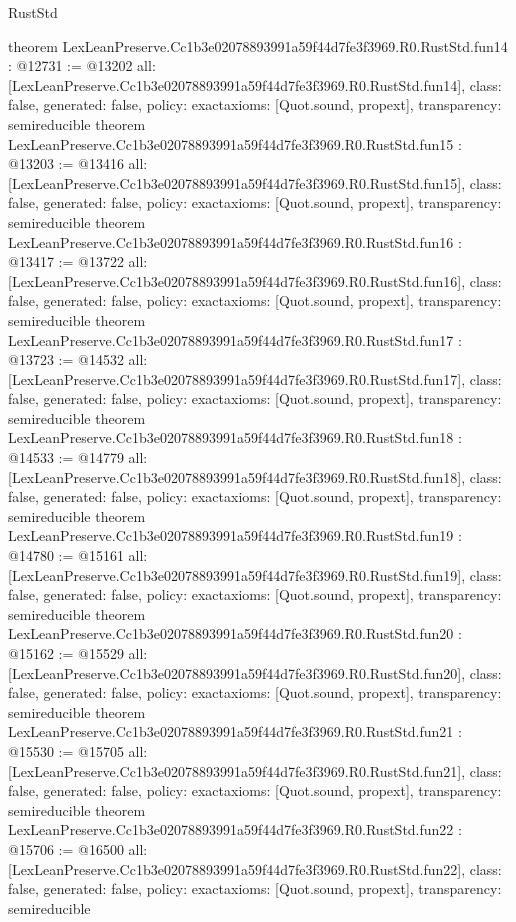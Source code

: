 \begin{lexlean}{RustStd}
\begin{coremodule}
{}
theorem LexLeanPreserve.Cc1b3e02078893991a59f44d7fe3f3969.R0.RustStd.fun14 : @12731 := @13202 {
  all: [LexLeanPreserve.Cc1b3e02078893991a59f44d7fe3f3969.R0.RustStd.fun14],
  class: false,
  generated: false,
  policy: exact{axioms: [Quot.sound, propext]},
  transparency: semireducible
}
theorem LexLeanPreserve.Cc1b3e02078893991a59f44d7fe3f3969.R0.RustStd.fun15 : @13203 := @13416 {
  all: [LexLeanPreserve.Cc1b3e02078893991a59f44d7fe3f3969.R0.RustStd.fun15],
  class: false,
  generated: false,
  policy: exact{axioms: [Quot.sound, propext]},
  transparency: semireducible
}
theorem LexLeanPreserve.Cc1b3e02078893991a59f44d7fe3f3969.R0.RustStd.fun16 : @13417 := @13722 {
  all: [LexLeanPreserve.Cc1b3e02078893991a59f44d7fe3f3969.R0.RustStd.fun16],
  class: false,
  generated: false,
  policy: exact{axioms: [Quot.sound, propext]},
  transparency: semireducible
}
theorem LexLeanPreserve.Cc1b3e02078893991a59f44d7fe3f3969.R0.RustStd.fun17 : @13723 := @14532 {
  all: [LexLeanPreserve.Cc1b3e02078893991a59f44d7fe3f3969.R0.RustStd.fun17],
  class: false,
  generated: false,
  policy: exact{axioms: [Quot.sound, propext]},
  transparency: semireducible
}
theorem LexLeanPreserve.Cc1b3e02078893991a59f44d7fe3f3969.R0.RustStd.fun18 : @14533 := @14779 {
  all: [LexLeanPreserve.Cc1b3e02078893991a59f44d7fe3f3969.R0.RustStd.fun18],
  class: false,
  generated: false,
  policy: exact{axioms: [Quot.sound, propext]},
  transparency: semireducible
}
theorem LexLeanPreserve.Cc1b3e02078893991a59f44d7fe3f3969.R0.RustStd.fun19 : @14780 := @15161 {
  all: [LexLeanPreserve.Cc1b3e02078893991a59f44d7fe3f3969.R0.RustStd.fun19],
  class: false,
  generated: false,
  policy: exact{axioms: [Quot.sound, propext]},
  transparency: semireducible
}
theorem LexLeanPreserve.Cc1b3e02078893991a59f44d7fe3f3969.R0.RustStd.fun20 : @15162 := @15529 {
  all: [LexLeanPreserve.Cc1b3e02078893991a59f44d7fe3f3969.R0.RustStd.fun20],
  class: false,
  generated: false,
  policy: exact{axioms: [Quot.sound, propext]},
  transparency: semireducible
}
theorem LexLeanPreserve.Cc1b3e02078893991a59f44d7fe3f3969.R0.RustStd.fun21 : @15530 := @15705 {
  all: [LexLeanPreserve.Cc1b3e02078893991a59f44d7fe3f3969.R0.RustStd.fun21],
  class: false,
  generated: false,
  policy: exact{axioms: [Quot.sound, propext]},
  transparency: semireducible
}
theorem LexLeanPreserve.Cc1b3e02078893991a59f44d7fe3f3969.R0.RustStd.fun22 : @15706 := @16500 {
  all: [LexLeanPreserve.Cc1b3e02078893991a59f44d7fe3f3969.R0.RustStd.fun22],
  class: false,
  generated: false,
  policy: exact{axioms: [Quot.sound, propext]},
  transparency: semireducible
}
\end{coremodule}
\end{lexlean}
